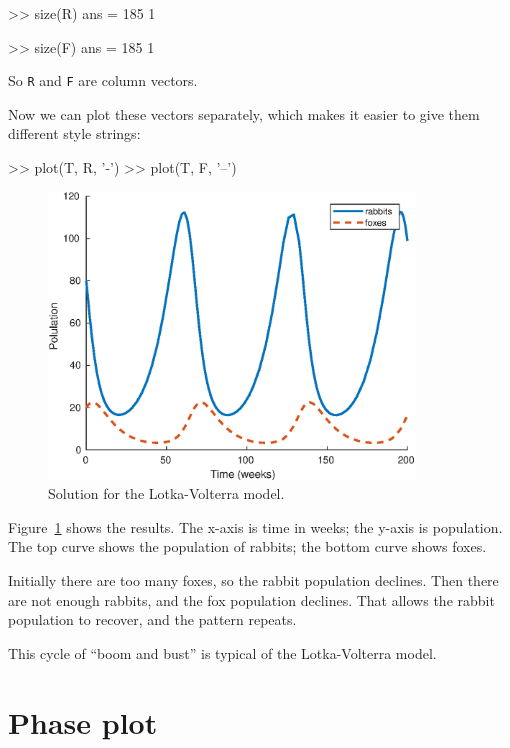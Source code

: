 \begin{code}
>> size(R)
ans = 185     1

>> size(F)
ans = 185     1
\end{code}

So {\tt R} and {\tt F} are column vectors.


Now we can plot these vectors separately, which makes it easier to give them different style strings:

\begin{code}
>> plot(T, R, '-')
>> plot(T, F, '--')
\end{code}

\begin{figure}
\centerline{\includegraphics[height=3in]{book/figs/lotka.eps}}
\caption{Solution for the Lotka-Volterra model.}
\label{fig:lotka}
\end{figure}


Figure~\ref{fig:lotka} shows the results. The x-axis is time in weeks; the y-axis is population.  The top curve shows the population of rabbits; the bottom curve shows foxes.


Initially there are too many foxes, so the rabbit population declines.  Then there are not enough rabbits, and the fox population declines.  That allows the rabbit population to recover, and the pattern repeats.

This cycle of ``boom and bust'' is typical of the Lotka-Volterra model.


\section{Phase plot}

